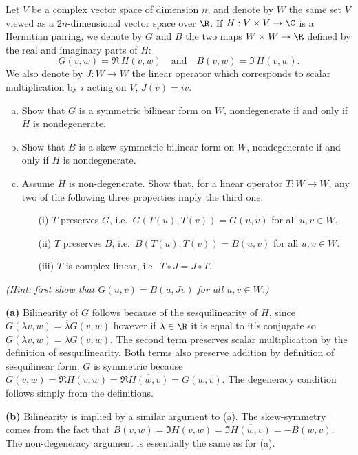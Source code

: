 \begin{problem}
Let $V$ be a complex vector space of dimension $n$, and denote by $W$ the same set $V$ viewed as a $2n$-dimensional vector space over $\R$. If $H : V \times V \to \C$ is a Hermitian pairing, we denote by $G$ and $B$ the two maps $W\times W\to \R$ defined by the real and imaginary parts of $H$: 
\[G(v,w)=\Re\, H(v,w)\quad \text{and} \quad B(v,w)=\Im\, H(v,w).\]
We also denote by $J:W\to W$ the linear operator which corresponds to scalar multiplication by $i$ acting on $V$, $J(v)=iv$.
\begin{enumerate}[(a)]
  \item Show that $G$ is a symmetric bilinear form on $W$, nondegenerate if and only if $H$ is nondegenerate.
  \item Show that $B$ is a skew-symmetric bilinear form on $W$, nondegenerate if and only if $H$ is nondegenerate.
  \item Assume $H$ is non-degenerate. Show that, for a linear operator $T:W\to W$, any two of the following three properties imply the third one:
  \begin{itemize}
  \item[(i)] $T$ preserves $G$, i.e.\ $G(T(u),T(v))=G(u,v)$ for all $u,v\in W$.
  \item[(ii)] $T$ preserves $B$, i.e.\ $B(T(u),T(v))=B(u,v)$ for all $u,v\in W$.
  \item[(iii)] $T$ is complex linear, i.e.\ $T\circ J=J\circ T$.
  \end{itemize}
\end{enumerate}
\end{problem}
\textit{(Hint: first show that $G(u,v)=B(u,Jv)$ for all $u,v\in W$.)}

\textbf{(a)} Bilinearity of $G$ follows because of the sesquilinearity of $H$, since $G(\lambda v, w)=\overline{\lambda}G(v,w)$ however if $\lambda\in \R$ it is equal to it's conjugate so $G(\lambda v, w)=\lambda G(v,w)$. The second term preserves scalar multiplication by the definition of sesquilinearity. Both terms also preserve addition by definition of sesquilinear form. $G$ is symmetric because $G(v,w)=\Re H(v,w)=\Re \overline{H(w,v)} = G(w,v)$. The degeneracy condition follows simply from the definitions.

\textbf{(b)} Bilinearity is implied by a similar argument to (a). The skew-symmetry comes from the fact that $B(v,w)=\Im H(v,w)= \Im \overline{H(w,v)} = -B(w,v)$. The non-degeneracy argument is essentially the same as for (a). 

